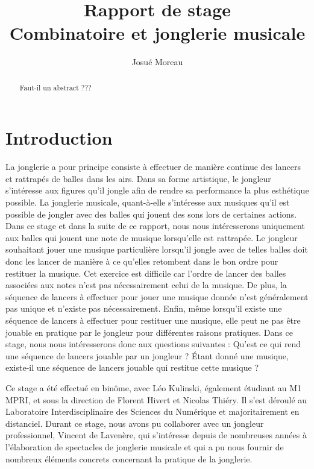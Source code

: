 \documentclass[a4paper]{easychair}
\begin{document}
\title{Rapport de stage\\\large{Combinatoire et jonglerie musicale}}
\titlerunning{}
\author{Josué Moreau}
\authorrunning{}
\institute{}
\maketitle

\begin{abstract}
  Faut-il un abstract ???
\end{abstract}

\section{Introduction}
La jonglerie a pour principe consiste à effectuer de manière continue des
lancers et rattrapés de balles dans les airs. Dans sa forme artistique, le
jongleur s'intéresse aux figures qu'il jongle afin de rendre sa performance la
plus esthétique possible. La jonglerie musicale, quant-à-elle s'intéresse aux
musiques qu'il est possible de jongler avec des balles qui jouent des sons lors
de certaines actions. Dans ce stage et dans la suite de ce rapport, nous nous
intéresserons uniquement aux balles qui jouent une note de musique lorsqu'elle
est rattrapée. Le jongleur souhaitant jouer une musique particulière lorsqu'il
jongle avec de telles balles doit donc les lancer de manière à ce qu'elles
retombent dans le bon ordre pour restituer la musique. Cet exercice est
difficile car l'ordre de lancer des balles associées aux notes n'est pas
nécessairement celui de la musique. De plus, la séquence de lancers à effectuer
pour jouer une musique donnée n'est généralement pas unique et n'existe pas
nécessairement. Enfin, même lorsqu'il existe une séquence de lancers à effectuer
pour restituer une musique, elle peut ne pas être jouable en pratique par le
jongleur pour différentes raisons pratiques. Dans ce stage, nous nous
intéresserons donc aux questions suivantes : Qu'est ce qui rend une séquence de
lancers jouable par un jongleur ? Étant donné une musique, existe-il une
séquence de lancers jouable qui restitue cette musique ?

Ce stage a été effectué en binôme, avec Léo Kulinski, également étudiant au M1
MPRI, et sous la direction de Florent Hivert et Nicolas Thiéry. Il s'est déroulé
au Laboratoire Interdisciplinaire des Sciences du Numérique et majoritairement
en distanciel. Durant ce stage, nous avons pu collaborer avec un jongleur
professionnel, Vincent de Lavenère, qui s'intéresse depuis de nombreuses années
à l'élaboration de spectacles de jonglerie musicale et qui a pu nous fournir de
nombreux éléments concrets concernant la pratique de la jonglerie.
\end{document}
